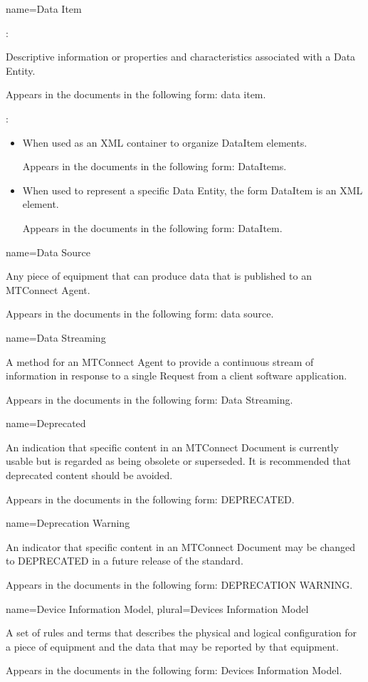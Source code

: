 {
  name={Data Item}
}
{
	:

	Descriptive information or properties and characteristics associated with a Data Entity.

	Appears in the documents in the following form: data item.

	:

    \begin{itemize}
	\item When used as an XML container to organize DataItem elements.

	Appears in the documents in the following form: DataItems.

	\item When used to represent a specific Data Entity, the form DataItem is an XML element.  

	Appears in the documents in the following form: DataItem.
    \end{itemize}
}


{
  name={Data Source}
}
{
	Any piece of equipment that can produce data that is published to an MTConnect Agent.

	Appears in the documents in the following form: data source.
}


{
  name={Data Streaming}
}
{
	A method for an MTConnect Agent to provide a continuous stream of information in response to a single Request from a client software application.

	Appears in the documents in the following form: Data Streaming.
}


{
  name={Deprecated}
}
{
	An indication that specific content in an MTConnect Document is currently usable but is regarded as being obsolete or superseded.  It is recommended that deprecated content should be avoided.

	Appears in the documents in the following form: DEPRECATED.
}


{
  name={Deprecation Warning}
}
{
	An indicator that specific content in an MTConnect Document may be changed to DEPRECATED in a future release of the standard.

	Appears in the documents in the following form: DEPRECATION WARNING.
}


{
  name={Device Information Model},
  plural={Devices Information Model}
}
{
	A set of rules and terms that describes the physical and logical configuration for a piece of equipment and the data that may be reported by that equipment.    

	Appears in the documents in the following form: Devices Information Model.
}


